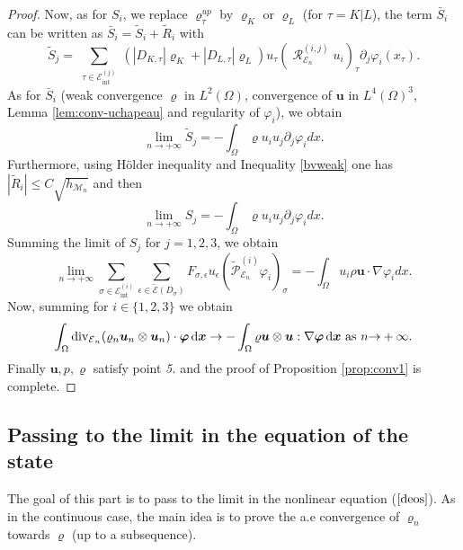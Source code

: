 \documentclass{amsart}
\numberwithin{equation}{section}
\begin{document}
\begin{proof}
Now, as for $S_i$, we replace ${\varrho}^{up}_{\tau}$ by ${\varrho}_K$ or ${\varrho}_L$ (for ${\tau}=K|L$),  the term $\bar S_i$ can be written as $\bar S_i=\tilde S_i + \tilde R_i$ with
\[
\tilde S_j=
\sum_{\substack{{\tau} \in {{\mathcal E}_{\mathrm{int}}^{(j)}}}} (|D_{K,{\tau}} | {\varrho}_K +  |D_{L,{\tau}}|{\varrho}_L)u_{\tau} (\operatorname{{\mathcal{R}}}_{\operatorname{{\mathcal{E}}}_n}^{(i,j)} {u_i})_{\tau} \partial_j {\varphi}_i(x_{\tau}).
\]
As for $\bar S_i$ (weak convergence ${\varrho}$ in $L^2(\Omega)$, convergence of ${{\boldsymbol u}}$ in $L^4(\Omega)^3$, Lemma \ref{lem:conv-uchapeau} and regularity of ${\varphi}_i$), we obtain
\[
\lim_{{n {\rightarrow} + \infty}} \tilde S_j= -\int_\Omega {\varrho} u_i u_j \partial_j {\varphi}_i dx.
\]
Furthermore, using H\"older inequality and Inequality \eqref{bvweak} one has $| \tilde R_i| \le C \sqrt{h_{{{\mathcal M}}_n}}$ and then 
\[
\lim_{{n {\rightarrow} + \infty}} S_j = -\int_\Omega {\varrho} u_i u_j \partial_j {\varphi}_i dx.
\]
Summing the limit of $S_j$ for $j=1,2,3$, we obtain
\[
\lim_{{n {\rightarrow} + \infty}} \sum_{{{\sigma}} \in {{\mathcal E}_{\mathrm{int}}^{(i)}}} \sum_{{\epsilon} \in {\widetilde {{\mathcal E}}}(D_{{\sigma}})}
F_{{{\sigma}},{\epsilon}} u_{\epsilon}  (\widetilde{\mathcal P}^{(i)}_{{{\mathcal E}}_n} \varphi_i)_{{\sigma}}=
-\int_\Omega u_i \rho {{\boldsymbol u}} \cdot {{\nabla}} {\varphi}_i dx.
\]
Now, 
summing for $i \in \{1,2,3\}$ we obtain
\begin{equation*}
\int_\Omega \operatorname{div}_{\operatorname{{\mathcal{E}}}_n} ({\varrho}_n {{\boldsymbol u}}_n \otimes {{\boldsymbol u}}_n) \cdot {{\boldsymbol \varphi}} {\, {\rm d}{{\boldsymbol x}}} \to - \int_\Omega {\varrho} {{\boldsymbol u}} \otimes {{\boldsymbol u}} : \nabla \bm{\varphi} {\, {\rm d}{{\boldsymbol x}}} \ \text{as} \ {{n {\rightarrow} + \infty}}.
\end{equation*}
Finally ${{\boldsymbol u}},p,{\varrho} $ satisfy point {\it 5.} and the proof of Proposition \ref{prop:conv1} is complete.
\end{proof}

\subsection{Passing to the limit in the equation of the state}

The goal of this part is to pass to the limit in the nonlinear equation ($\ref{deos}$). As in the continuous case, the main idea is to prove the a.e convergence of ${\varrho}_n $ towards ${\varrho}$ (up to a subsequence).
\end{document}
